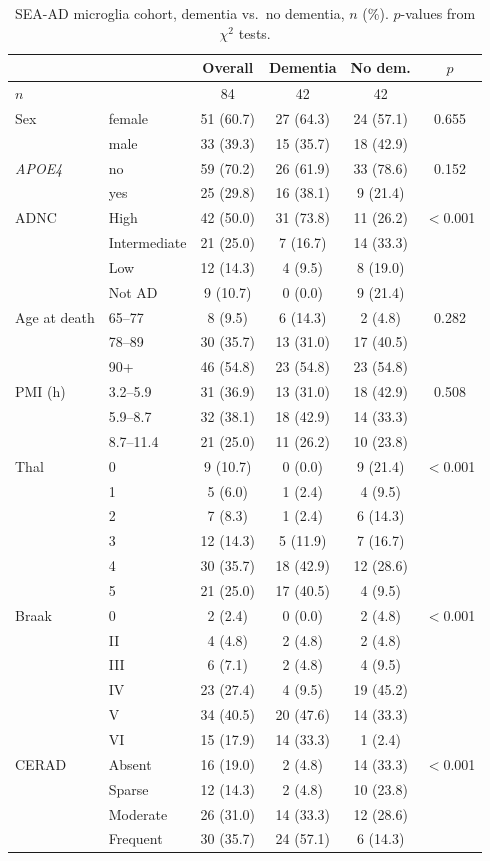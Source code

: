 \documentclass[10pt,twocolumn,letterpaper]{article}
\newcommand{\gene}[1]{\textit{#1}}
\begin{document}
\begin{table}[t]
\centering\scriptsize
\caption{SEA-AD microglia cohort, dementia vs.\ no dementia, $n$ (\%). $p$-values from $\chi^2$ tests.}
\label{tab:cohort}
\setlength{\tabcolsep}{2.5pt}
\begin{tabular}{llccc c}
\toprule
& & Overall & Dementia & No dem. & $p$ \\
\midrule
$n$ & & 84 & 42 & 42 & \\
Sex & female & 51 (60.7) & 27 (64.3) & 24 (57.1) & 0.655 \\
 & male & 33 (39.3) & 15 (35.7) & 18 (42.9) & \\
\gene{APOE4} & no & 59 (70.2) & 26 (61.9) & 33 (78.6) & 0.152\\
 & yes & 25 (29.8) & 16 (38.1) & 9 (21.4) & \\
ADNC & High & 42 (50.0) & 31 (73.8) & 11 (26.2) & $<$0.001\\
 & Intermediate & 21 (25.0) & 7 (16.7) & 14 (33.3) & \\
 & Low & 12 (14.3) & 4 (9.5) & 8 (19.0) & \\
 & Not AD & 9 (10.7) & 0 (0.0) & 9 (21.4) & \\
Age at death & 65--77 & 8 (9.5) & 6 (14.3) & 2 (4.8) & 0.282\\
 & 78--89 & 30 (35.7) & 13 (31.0) & 17 (40.5) & \\
 & 90+ & 46 (54.8) & 23 (54.8) & 23 (54.8) & \\
PMI (h) & 3.2--5.9 & 31 (36.9) & 13 (31.0) & 18 (42.9) & 0.508\\
 & 5.9--8.7 & 32 (38.1) & 18 (42.9) & 14 (33.3) & \\
 & 8.7--11.4 & 21 (25.0) & 11 (26.2) & 10 (23.8) & \\
Thal & 0 & 9 (10.7) & 0 (0.0) & 9 (21.4) & $<$0.001\\
 & 1 & 5 (6.0) & 1 (2.4) & 4 (9.5) & \\
 & 2 & 7 (8.3) & 1 (2.4) & 6 (14.3) & \\
 & 3 & 12 (14.3) & 5 (11.9) & 7 (16.7) & \\
 & 4 & 30 (35.7) & 18 (42.9) & 12 (28.6) & \\
 & 5 & 21 (25.0) & 17 (40.5) & 4 (9.5) & \\
Braak & 0 & 2 (2.4) & 0 (0.0) & 2 (4.8) & $<$0.001\\
 & II & 4 (4.8) & 2 (4.8) & 2 (4.8) & \\
 & III & 6 (7.1) & 2 (4.8) & 4 (9.5) & \\
 & IV & 23 (27.4) & 4 (9.5) & 19 (45.2) & \\
 & V & 34 (40.5) & 20 (47.6) & 14 (33.3) & \\
 & VI & 15 (17.9) & 14 (33.3) & 1 (2.4) & \\
CERAD & Absent & 16 (19.0) & 2 (4.8) & 14 (33.3) & $<$0.001\\
 & Sparse & 12 (14.3) & 2 (4.8) & 10 (23.8) & \\
 & Moderate & 26 (31.0) & 14 (33.3) & 12 (28.6) & \\
 & Frequent & 30 (35.7) & 24 (57.1) & 6 (14.3) & \\
\bottomrule
\end{tabular}
\end{table}
\end{document}

